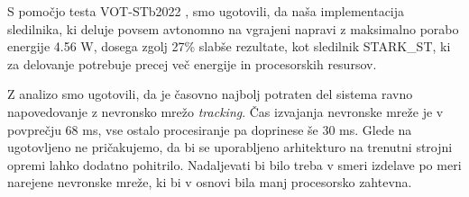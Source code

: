 \documentclass[a4paper,12pt,openright]{book}
\begin{document}
S pomočjo testa VOT-STb2022 \cite{vot2022}, smo ugotovili, da naša implementacija sledilnika, ki deluje povsem avtonomno na vgrajeni napravi z maksimalno porabo energije 4.56 W, dosega zgolj 27\% slabše rezultate, kot sledilnik STARK\_ST, ki za delovanje potrebuje precej več energije in procesorskih resursov.

Z analizo smo ugotovili, da je časovno najbolj potraten del sistema ravno napovedovanje z nevronsko mrežo \emph{tracking}. Čas izvajanja nevronske mreže je v povprečju 68 ms, vse ostalo procesiranje pa doprinese še 30 ms. Glede na ugotovljeno ne pričakujemo, da bi se uporabljeno arhitekturo na trenutni strojni opremi lahko dodatno pohitrilo. Nadaljevati bi bilo treba v smeri izdelave po meri narejene nevronske mreže, ki bi v osnovi bila manj procesorsko zahtevna.





\printbibliography[heading=bibintoc,title={Celotna literatura}]
\end{document}
